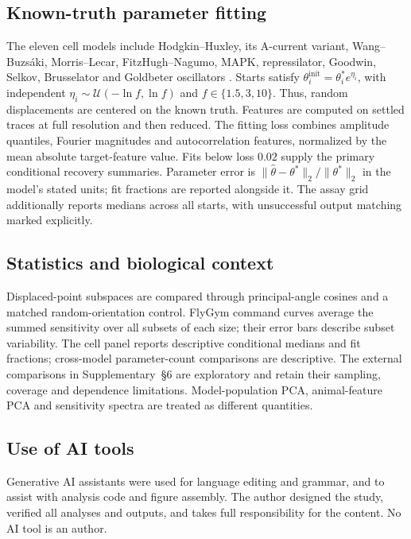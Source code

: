 \documentclass[11pt,letterpaper]{article}
\begin{document}
\subsection*{Known-truth parameter fitting}
The eleven cell models include Hodgkin--Huxley, its A-current variant, Wang--Buzs\'aki, Morris--Lecar, FitzHugh--Nagumo, MAPK, repressilator, Goodwin, Selkov, Brusselator and Goldbeter oscillators \citep{hodgkin1952quantitative,connor1971prediction,wang1996gamma,morris1981voltage,fitzhugh1961impulses,kholodenko2000negative,elowitz2000synthetic,goodwin1965oscillatory,selkov1968self,prigogine1968symmetry,goldbeter1991minimal}. Starts satisfy $\theta_i^{\mathrm{init}}=\theta_i^*e^{\eta_i}$, with independent $\eta_i\sim\mathcal U(-\ln f,\ln f)$ and $f\in\{1.5,3,10\}$. Thus, random displacements are centered on the known truth. Features are computed on settled traces at full resolution and then reduced. The fitting loss combines amplitude quantiles, Fourier magnitudes and autocorrelation features, normalized by the mean absolute target-feature value. Fits below loss $0.02$ supply the primary conditional recovery summaries. Parameter error is $\|\hat\theta-\theta^*\|_2/\|\theta^*\|_2$ in the model's stated units; fit fractions are reported alongside it. The assay grid additionally reports medians across all starts, with unsuccessful output matching marked explicitly.

\subsection*{Statistics and biological context}
Displaced-point subspaces are compared through principal-angle cosines and a matched random-orientation control. FlyGym command curves average the summed sensitivity over all subsets of each size; their error bars describe subset variability. The cell panel reports descriptive conditional medians and fit fractions; cross-model parameter-count comparisons are descriptive. The external comparisons in Supplementary~\S6 are exploratory and retain their sampling, coverage and dependence limitations. Model-population PCA, animal-feature PCA and sensitivity spectra are treated as different quantities.

\subsection*{Use of AI tools}
Generative AI assistants were used for language editing and grammar, and to assist with analysis code and figure assembly. The author designed the study, verified all analyses and outputs, and takes full responsibility for the content. No AI tool is an author.
\end{document}
